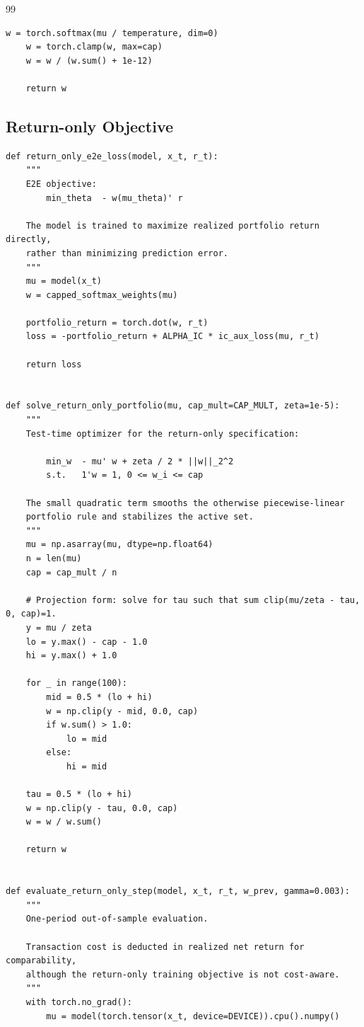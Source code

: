 \documentclass[11pt]{article}
\begin{document}
\begin{thebibliography}{99}
\begin{lstlisting}[style=appendixpython,caption={Shared neural prediction model and auxiliary loss}]
    w = torch.softmax(mu / temperature, dim=0)
    w = torch.clamp(w, max=cap)
    w = w / (w.sum() + 1e-12)

    return w
\end{lstlisting}

\subsection{Return-only Objective}

\begin{lstlisting}[style=appendixpython,caption={Core implementation of the return-only objective}]
def return_only_e2e_loss(model, x_t, r_t):
    """
    E2E objective:
        min_theta  - w(mu_theta)' r

    The model is trained to maximize realized portfolio return directly,
    rather than minimizing prediction error.
    """
    mu = model(x_t)
    w = capped_softmax_weights(mu)

    portfolio_return = torch.dot(w, r_t)
    loss = -portfolio_return + ALPHA_IC * ic_aux_loss(mu, r_t)

    return loss


def solve_return_only_portfolio(mu, cap_mult=CAP_MULT, zeta=1e-5):
    """
    Test-time optimizer for the return-only specification:

        min_w  - mu' w + zeta / 2 * ||w||_2^2
        s.t.   1'w = 1, 0 <= w_i <= cap

    The small quadratic term smooths the otherwise piecewise-linear
    portfolio rule and stabilizes the active set.
    """
    mu = np.asarray(mu, dtype=np.float64)
    n = len(mu)
    cap = cap_mult / n

    # Projection form: solve for tau such that sum clip(mu/zeta - tau, 0, cap)=1.
    y = mu / zeta
    lo = y.max() - cap - 1.0
    hi = y.max() + 1.0

    for _ in range(100):
        mid = 0.5 * (lo + hi)
        w = np.clip(y - mid, 0.0, cap)
        if w.sum() > 1.0:
            lo = mid
        else:
            hi = mid

    tau = 0.5 * (lo + hi)
    w = np.clip(y - tau, 0.0, cap)
    w = w / w.sum()

    return w


def evaluate_return_only_step(model, x_t, r_t, w_prev, gamma=0.003):
    """
    One-period out-of-sample evaluation.

    Transaction cost is deducted in realized net return for comparability,
    although the return-only training objective is not cost-aware.
    """
    with torch.no_grad():
        mu = model(torch.tensor(x_t, device=DEVICE)).cpu().numpy()


\end{lstlisting}
\end{thebibliography}
\end{document}
